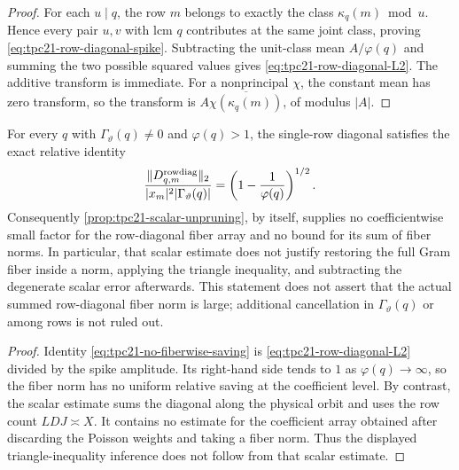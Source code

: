 \begin{proof}
For each \(u\mid q\), the row \(m\) belongs to exactly the class
\(\kappa_q(m)\bmod u\).  Hence every pair \(u,v\) with lcm \(q\)
contributes at the same joint class, proving
\eqref{eq:tpc21-row-diagonal-spike}.  Subtracting the unit-class mean
\(A/\varphi(q)\) and summing the two possible squared values gives
\eqref{eq:tpc21-row-diagonal-L2}.  The additive transform is immediate.
For a nonprincipal \(\chi\), the constant mean has zero transform, so
the transform is \(A\overline{\chi(\kappa_q(m))}\), of modulus
\(|A|\).
\end{proof}

\begin{proposition}
\label{prop:tpc21-nonlinear-noncommutation}
For every \(q\) with \(\Gamma_\vartheta(q)\ne0\) and
\(\varphi(q)>1\), the single-row diagonal satisfies the exact relative
identity
\begin{equation}
 \frac{\lVert D_{q,m}^{\rm rowdiag}\rVert_2}
 {|x_m|^2|\Gamma_\vartheta(q)|}
 =\left(1-\frac1{\varphi(q)}\right)^{1/2}.
 \label{eq:tpc21-no-fiberwise-saving}
\end{equation}
Consequently \cref{prop:tpc21-scalar-unpruning}, by itself, supplies no
coefficientwise small factor for the row-diagonal fiber array and no
bound for its sum of fiber norms.  In particular, that scalar estimate
does not justify restoring the full Gram fiber inside a norm, applying
the triangle inequality, and subtracting the degenerate scalar error
afterwards.  This statement does not assert that the actual summed
row-diagonal fiber norm is large; additional cancellation in
\(\Gamma_\vartheta(q)\) or among rows is not ruled out.
\end{proposition}

\begin{proof}
Identity \eqref{eq:tpc21-no-fiberwise-saving} is
\eqref{eq:tpc21-row-diagonal-L2} divided by the spike amplitude.
Its right-hand side tends to \(1\) as \(\varphi(q)\to\infty\), so the
fiber norm has no uniform relative saving at the coefficient level.
By contrast, the scalar estimate sums the diagonal along the physical
orbit and uses the row count \(LDJ\asymp X\).  It contains no estimate
for the coefficient array obtained after discarding the Poisson
weights and taking a fiber norm.  Thus the displayed triangle-inequality
inference does not follow from that scalar estimate.
\end{proof}

